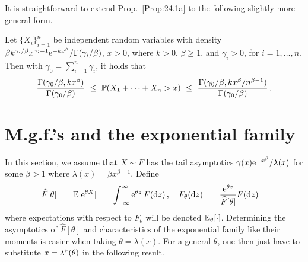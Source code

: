 It is straightforward to extend Prop.~\ref{Prop:24.1a} to the following slightly more general form.
\begin{proposition}\label{Prop:24.1b} Let $\{X_i\}_{i=1}^n$ be independent random variables with
density $\beta k^{\gamma_i/\beta} x^{\gamma_i-1}\mathrm{e}^{-kx^\beta}
/\Gamma(\gamma_i/\beta)$, $x>0$, where $k>0$, $\beta\geq 1$, and $\gamma_i>0$, for $i=1,\dots,n$. Then with $\gamma_0=\sum_{i=1}^n \gamma_i$, it holds that
\[ \frac{\Gamma(\gamma_0/\beta,kx^\beta)}{\Gamma(\gamma_0/\beta)}
\ \le\ \operatorname{{\mathbb P}}(X_1 + \cdots + X_n > x)\ \le \
\frac{\Gamma(\gamma_0/\beta,kx^\beta/n^{\beta-1})}{\Gamma(
\gamma_0/\beta)}\,.\]
\end{proposition}


\section{M.g.f.'s and the exponential family}\label{S:ExpFam}

In this section, we assume that $X \sim F$ has the tail asymptotics $\gamma(x)\mathrm{e}^{-x^\beta}/\lambda(x)$ for some $\beta>1$ where $\lambda(x)=\beta x^{\beta-1}$.
Define
\begin{align*}
\widehat F[\theta]\ &=\ \operatorname{{\mathbb E}} [\mathrm{e}^{\theta X}]\ =\
\int_{-\infty}^\infty \mathrm{e}^{\theta z}\, F(\mathrm{d} z)\,,\quad
F_\theta(\mathrm{d} z)\ =\ \frac{\mathrm{e}^{\theta z}}{\widehat F[\theta]}F(\mathrm{d} z)
\end{align*}
where expectations with respect to $F_\theta$ will be denoted $\operatorname{{\mathbb E}}_\theta[\cdot]$.
Determining the asymptotics of $\widehat F[\theta]$ and characteristics of the exponential family
like their moments is easier when taking $\theta=\lambda(x)$. For a general $\theta$, one then
just have to substitute $x=\lambda^{\ginv}(\theta)$ in the following result.

